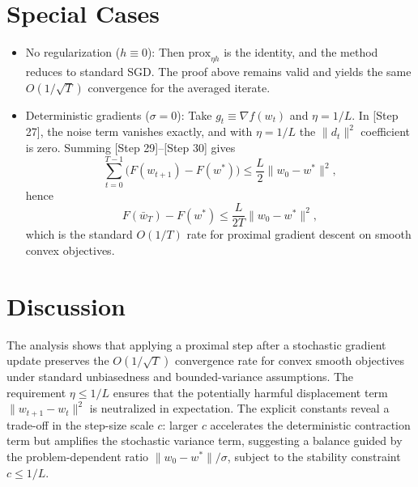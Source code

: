 \documentclass{article}
\newcommand{\prox}{\mathrm{prox}}
\begin{document}
\section*{Special Cases}
\begin{itemize}
\item No regularization ($h\equiv 0$): Then $\prox_{\eta h}$ is the identity, and the method reduces to standard SGD. The proof above remains valid and yields the same $O(1/\sqrt{T})$ convergence for the averaged iterate.
\item Deterministic gradients ($\sigma=0$): Take $g_t \equiv \nabla f(w_t)$ and $\eta = 1/L$. In [Step 27], the noise term vanishes exactly, and with $\eta=1/L$ the $\|d_t\|^2$ coefficient is zero. Summing [Step 29]--[Step 30] gives
\[
\sum_{t=0}^{T-1} \big(F(w_{t+1}) - F(w^*)\big) \le \frac{L}{2}\|w_0 - w^*\|^2,
\]
hence
\[
F(\bar w_T) - F(w^*) \le \frac{L}{2T}\|w_0 - w^*\|^2,
\]
which is the standard $O(1/T)$ rate for proximal gradient descent on smooth convex objectives.
\end{itemize}

\section*{Discussion}
The analysis shows that applying a proximal step after a stochastic gradient update preserves the $O(1/\sqrt{T})$ convergence rate for convex smooth objectives under standard unbiasedness and bounded-variance assumptions. The requirement $\eta \le 1/L$ ensures that the potentially harmful displacement term $\|w_{t+1}-w_t\|^2$ is neutralized in expectation. The explicit constants reveal a trade-off in the step-size scale $c$: larger $c$ accelerates the deterministic contraction term but amplifies the stochastic variance term, suggesting a balance guided by the problem-dependent ratio $\|w_0-w^*\|/\sigma$, subject to the stability constraint $c \le 1/L$.
\end{document}
